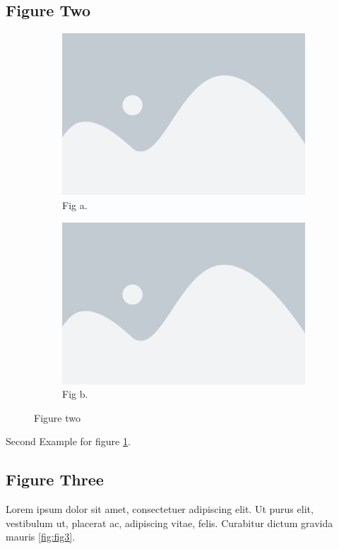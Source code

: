\subsection{Figure Two}
\begin{figure}[!h]
  \centering
  \begin{subfigure}[b]{0.4\linewidth}
    \includegraphics[width=\linewidth]{../images/fig1.png}
    \caption{Fig a.}
  \end{subfigure}
  \begin{subfigure}[b]{0.4\linewidth}
    \includegraphics[width=\linewidth]{../images/fig1.png}
    \caption{Fig b.}
  \end{subfigure}
  \caption{Figure two}
  \label{fig:figtwo}
\end{figure}
Second Example for figure  \ref{fig:figtwo}.
\lipsum[1-1]

\subsection{Figure Three}
Lorem ipsum dolor sit amet, consectetuer adipiscing elit. Ut purus elit, vestibulum
ut, placerat ac, adipiscing vitae, felis. Curabitur dictum gravida mauris \ref{fig:fig3}.


